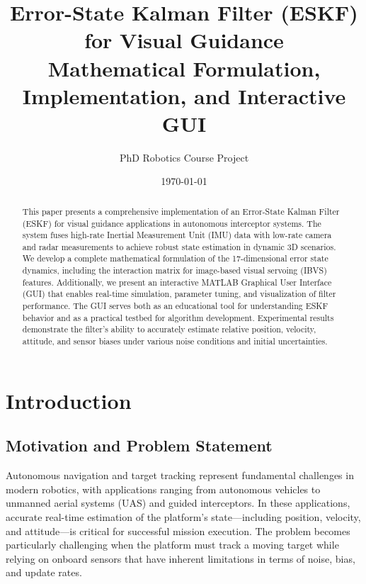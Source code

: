 \documentclass[11pt,a4paper]{article}
\title{Error-State Kalman Filter (ESKF) for Visual Guidance\\
\large Mathematical Formulation, Implementation, and Interactive GUI}
\author{PhD Robotics Course Project}
\date{\today}
\begin{document}
\maketitle

\begin{abstract}
This paper presents a comprehensive implementation of an Error-State Kalman Filter (ESKF) for visual guidance applications in autonomous interceptor systems. The system fuses high-rate Inertial Measurement Unit (IMU) data with low-rate camera and radar measurements to achieve robust state estimation in dynamic 3D scenarios. We develop a complete mathematical formulation of the 17-dimensional error state dynamics, including the interaction matrix for image-based visual servoing (IBVS) features. Additionally, we present an interactive MATLAB Graphical User Interface (GUI) that enables real-time simulation, parameter tuning, and visualization of filter performance. The GUI serves both as an educational tool for understanding ESKF behavior and as a practical testbed for algorithm development. Experimental results demonstrate the filter's ability to accurately estimate relative position, velocity, attitude, and sensor biases under various noise conditions and initial uncertainties.
\end{abstract}

\tableofcontents
\newpage

\section{Introduction}

\subsection{Motivation and Problem Statement}

Autonomous navigation and target tracking represent fundamental challenges in modern robotics, with applications ranging from autonomous vehicles to unmanned aerial systems (UAS) and guided interceptors. In these applications, accurate real-time estimation of the platform's state---including position, velocity, and attitude---is critical for successful mission execution. The problem becomes particularly challenging when the platform must track a moving target while relying on onboard sensors that have inherent limitations in terms of noise, bias, and update rates.
\end{document}
